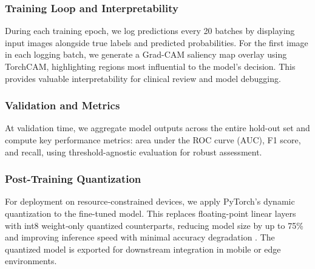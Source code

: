 \subsubsection{Training Loop and Interpretability}
During each training epoch, we log predictions every 20 batches by displaying input images alongside true labels and predicted probabilities. For the first image in each logging batch, we generate a Grad-CAM saliency map overlay using TorchCAM, highlighting regions most influential to the model’s decision. This provides valuable interpretability for clinical review and model debugging.

\subsubsection{Validation and Metrics}
At validation time, we aggregate model outputs across the entire hold-out set and compute key performance metrics: area under the ROC curve (AUC), F1 score, and recall, using threshold-agnostic evaluation for robust assessment.

\subsubsection{Post-Training Quantization}
For deployment on resource‐constrained devices, we apply PyTorch’s dynamic quantization to the fine-tuned model. This replaces floating-point linear layers with int8 weight‐only quantized counterparts, reducing model size by up to 75\% and improving inference speed with minimal accuracy degradation . The quantized model is exported for downstream integration in mobile or edge environments.


